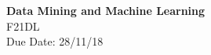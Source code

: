 \documentclass[a4paper, 11pt]{article}
\begin{document}
\noindent
\large\textbf{Data Mining and Machine Learning} \\
\normalsize F21DL \\
Due Date: 28/11/18  \\



\tableofcontents


\newpage


\newpage


\newpage


\newpage


\newpage

\end{document}
